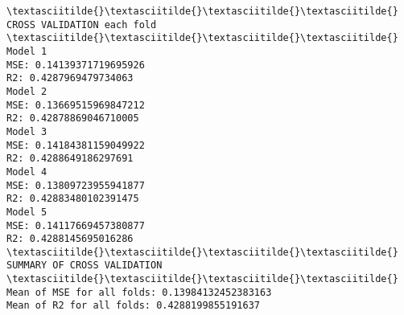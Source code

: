 \documentclass[11pt]{article}
\begin{document}
    \begin{Verbatim}[commandchars=\\\{\}]
\textasciitilde{}\textasciitilde{}\textasciitilde{}\textasciitilde{} CROSS VALIDATION each fold \textasciitilde{}\textasciitilde{}\textasciitilde{}\textasciitilde{}
Model 1
MSE: 0.14139371719695926
R2: 0.4287969479734063
Model 2
MSE: 0.13669515969847212
R2: 0.42878869046710005
Model 3
MSE: 0.14184381159049922
R2: 0.4288649186297691
Model 4
MSE: 0.13809723955941877
R2: 0.42883480102391475
Model 5
MSE: 0.14117669457380877
R2: 0.4288145695016286
\textasciitilde{}\textasciitilde{}\textasciitilde{}\textasciitilde{} SUMMARY OF CROSS VALIDATION \textasciitilde{}\textasciitilde{}\textasciitilde{}\textasciitilde{}
Mean of MSE for all folds: 0.13984132452383163
Mean of R2 for all folds: 0.4288199855191637

    \end{Verbatim}


    
    
    
    
\end{document}
